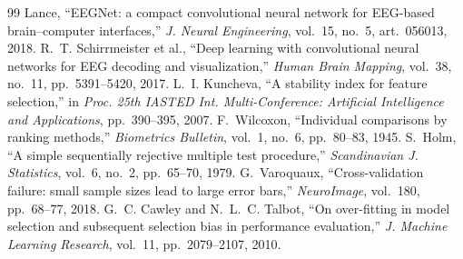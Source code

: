 \documentclass[11pt,a4paper]{article}
\begin{document}
\begin{thebibliography}{99}
Lance, ``EEGNet: a compact convolutional neural network for EEG-based brain--computer interfaces,''
\emph{J. Neural Engineering}, vol.~15, no.~5, art.~056013, 2018.
 R.~T. Schirrmeister et al., ``Deep learning with convolutional neural networks
for EEG decoding and visualization,'' \emph{Human Brain Mapping}, vol.~38, no.~11, pp.~5391--5420, 2017.
 L.~I. Kuncheva, ``A stability index for feature selection,'' in \emph{Proc. 25th
IASTED Int. Multi-Conference: Artificial Intelligence and Applications}, pp.~390--395, 2007.
 F.~Wilcoxon, ``Individual comparisons by ranking methods,'' \emph{Biometrics
Bulletin}, vol.~1, no.~6, pp.~80--83, 1945.
 S.~Holm, ``A simple sequentially rejective multiple test procedure,'' \emph{Scandinavian
J. Statistics}, vol.~6, no.~2, pp.~65--70, 1979.
 G.~Varoquaux, ``Cross-validation failure: small sample sizes lead to large error
bars,'' \emph{NeuroImage}, vol.~180, pp.~68--77, 2018.
 G.~C. Cawley and N.~L.~C. Talbot, ``On over-fitting in model selection and subsequent
selection bias in performance evaluation,'' \emph{J. Machine Learning Research}, vol.~11, pp.~2079--2107,
2010.
\end{thebibliography}
\end{document}
